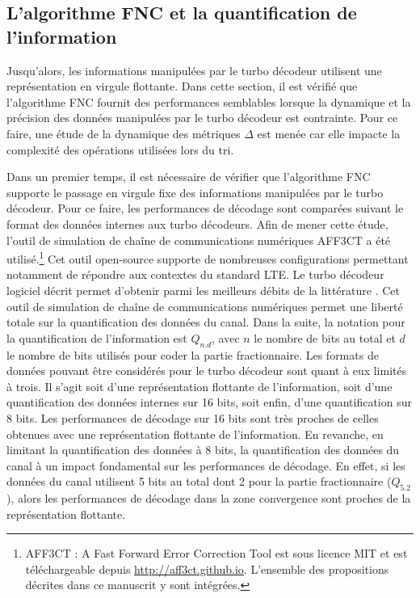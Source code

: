 \subsection{L'algorithme FNC et la quantification de l'information}
Jusqu'alors, les informations manipulées par le turbo décodeur utilisent une représentation en virgule flottante. Dans cette section, 
il est vérifié que l'algorithme FNC fournit des performances semblables lorsque la dynamique et la précision des données manipulées par
le turbo décodeur est contrainte. Pour ce faire, une étude de la dynamique des métriques $\Delta$ est menée car elle impacte
la complexité des opérations utilisées lors du tri.

Dans un premier temps, il est nécessaire de vérifier que l'algorithme FNC supporte le passage en virgule fixe des informations
manipulées par le turbo décodeur. Pour ce 
faire, les performances de décodage sont comparées suivant le format des données internes aux turbo décodeurs. 
Afin de mener cette étude, l'outil de simulation de chaîne de communications numériques AFF3CT a été utilisé.\footnote{AFF3CT : A Fast Forward Error Correction Tool est sous licence MIT et est téléchargeable depuis \url{http://aff3ct.github.io}. L'ensemble des propositions décrites dans ce manuscrit y sont intégrées.} Cet outil 
open-source supporte de nombreuses configurations permettant notamment de répondre aux contextes du standard LTE. Le 
turbo décodeur logiciel décrit permet d'obtenir parmi les meilleurs débits de la littérature . 
Cet outil de simulation de chaîne de communications numériques permet une liberté totale sur la quantification des 
données du canal. Dans la suite, la notation pour la quantification de l'information est $Q_{n.d}$, avec $n$ le nombre de bits au total
et $d$ le nombre de bits utilisés pour coder la partie fractionnaire. Les formats de données pouvant être considérés pour 
le turbo décodeur sont quant à eux limités à trois. Il s'agit soit d'une représentation flottante de l'information, 
soit d'une quantification des données internes sur 16 bits, soit enfin, d'une quantification sur 8 bits.
Les performances de décodage sur 16 bits sont très proches de celles obtenues avec une 
représentation flottante de l'information. En revanche, en limitant la quantification des données 
à 8 bits, la quantification des données du canal à un impact fondamental sur les performances de décodage.
En effet, si les données du canal utilisent 5 bits au total dont 2 pour la partie fractionnaire 
($Q_{5.2}$), alors les performances de décodage dans la zone convergence sont proches de la représentation flottante. 
